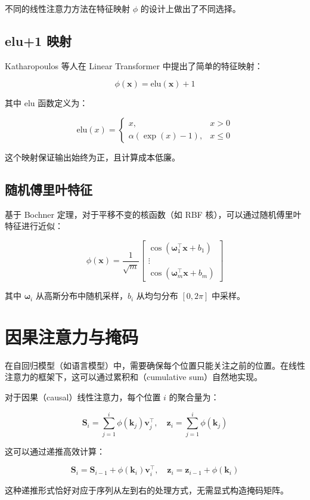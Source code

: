 不同的线性注意力方法在特征映射 $\phi$ 的设计上做出了不同选择。

\subsection{elu+1 映射}

Katharopoulos 等人在 Linear Transformer 中提出了简单的特征映射：

\begin{equation}
    \phi(\mathbf{x}) = \text{elu}(\mathbf{x}) + 1
\end{equation}

其中 elu 函数定义为：

\begin{equation}
    \text{elu}(x) = \begin{cases}
        x, & x > 0 \\
        \alpha(\exp(x) - 1), & x \leq 0
    \end{cases}
\end{equation}

这个映射保证输出始终为正，且计算成本低廉。

\subsection{随机傅里叶特征}

基于 Bochner 定理，对于平移不变的核函数（如 RBF 核），可以通过随机傅里叶特征进行近似：

\begin{equation}
    \phi(\mathbf{x}) = \frac{1}{\sqrt{m}} \begin{bmatrix}
        \cos(\boldsymbol{\omega}_1^\top \mathbf{x} + b_1) \\
        \vdots \\
        \cos(\boldsymbol{\omega}_m^\top \mathbf{x} + b_m)
    \end{bmatrix}
\end{equation}

其中 $\boldsymbol{\omega}_i$ 从高斯分布中随机采样，$b_i$ 从均匀分布 $[0, 2\pi]$ 中采样。

\section{因果注意力与掩码}

在自回归模型（如语言模型）中，需要确保每个位置只能关注之前的位置。在线性注意力的框架下，这可以通过累积和（cumulative sum）自然地实现。

对于因果（causal）线性注意力，每个位置 $i$ 的聚合量为：

\begin{equation}
    \mathbf{S}_i = \sum_{j=1}^i \phi(\mathbf{k}_j) \mathbf{v}_j^\top, \quad \mathbf{z}_i = \sum_{j=1}^i \phi(\mathbf{k}_j)
\end{equation}

这可以通过递推高效计算：

\begin{equation}
    \mathbf{S}_i = \mathbf{S}_{i-1} + \phi(\mathbf{k}_i) \mathbf{v}_i^\top, \quad \mathbf{z}_i = \mathbf{z}_{i-1} + \phi(\mathbf{k}_i)
\end{equation}

这种递推形式恰好对应于序列从左到右的处理方式，无需显式构造掩码矩阵。
